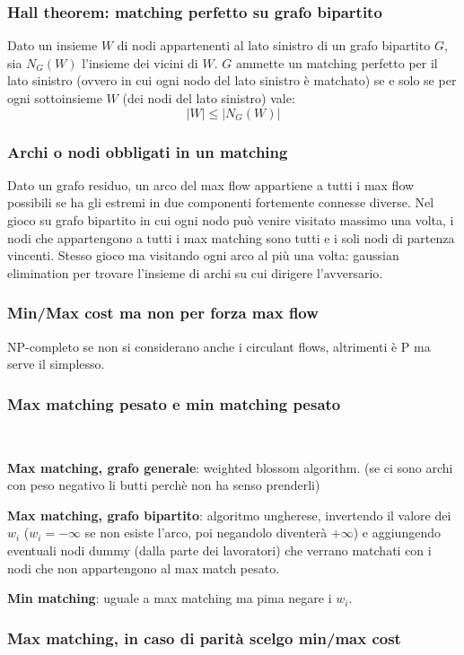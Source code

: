 \subsubsection{Hall theorem: matching perfetto su grafo bipartito}
Dato un insieme $W$ di nodi appartenenti al lato sinistro di un grafo bipartito $G$, sia $N_G(W)$ l'insieme dei vicini di $W$. $G$ ammette un matching perfetto per il lato sinistro (ovvero in cui ogni nodo del lato sinistro è matchato) se e solo se per ogni sottoinsieme $W$ (dei nodi del lato sinistro) vale: $$|W|\leq|N_G(W)|$$

\subsubsection{Archi o nodi obbligati in un matching}
Dato un grafo residuo, un arco del max flow appartiene a tutti i max flow possibili se ha gli estremi in due componenti fortemente connesse diverse. Nel gioco su grafo bipartito in cui ogni nodo può venire visitato massimo una volta, i nodi che appartengono a tutti i max matching sono tutti e i soli nodi di partenza vincenti. Stesso gioco ma visitando ogni arco al più una volta: gaussian elimination per trovare l'insieme di archi su cui dirigere l'avversario.

\subsubsection{Min/Max cost ma non per forza max flow}
NP-completo se non si considerano anche i circulant flows, altrimenti è P ma serve il simplesso.

\subsubsection{Max matching pesato e min matching pesato}
\,

\textbf{Max matching, grafo generale}: weighted blossom algorithm. (se ci sono archi con peso negativo li butti perchè non ha senso prenderli)

\textbf{Max matching, grafo bipartito}: algoritmo ungherese, invertendo il valore dei $w_i$ ($w_i=-\infty$ se non esiste l'arco, poi negandolo diventerà $+\infty$) e aggiungendo eventuali nodi dummy (dalla parte dei lavoratori) che verrano matchati con i nodi che non appartengono al max match pesato.

\textbf{Min matching}: uguale a max matching ma pima negare i $w_i$.

\subsubsection{Max matching, in caso di parità scelgo min/max cost}
\,

